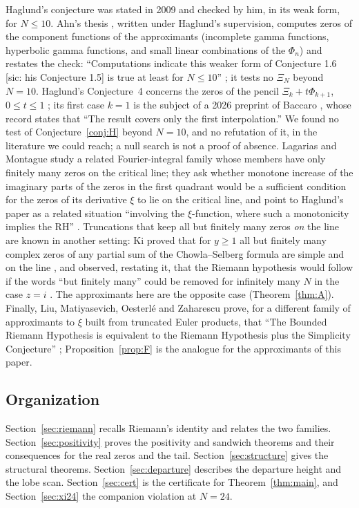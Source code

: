 \documentclass[11pt]{article}
\theoremstyle{plain}
\theoremstyle{definition}
\theoremstyle{remark}
\begin{document}
Haglund's conjecture was stated in 2009 \cite{Hag, HagJ} and checked by him, in
its weak form, for $N \le 10$. Ahn's thesis \cite{Ahn}, written under Haglund's
supervision, computes zeros of the component functions of the approximants
(incomplete gamma functions, hyperbolic gamma functions, and small linear
combinations of the $\Phi_n$) and restates the check: ``Computations indicate
this weaker form of Conjecture 1.6 [sic: his Conjecture 1.5] is true at least for $N \le 10$''
\cite[pp.~10--11]{Ahn}; it tests no $\Xi_N$ beyond $N = 10$. Haglund's Conjecture~4
concerns the zeros of the pencil $\Xi_k + t\Phi_{k+1}$, $0 \le t \le 1$
\cite[p.~11]{Hag}; its first case $k = 1$ is the subject of a 2026 preprint of
Baccaro \cite{Bac}, whose record states that ``The result covers only the first
interpolation.'' We found no test of Conjecture~\ref{conj:H} beyond $N = 10$, and
no refutation of it, in the literature we could reach; a null search is not a
proof of absence. Lagarias and Montague study a related Fourier-integral family
whose members have only finitely many zeros on the critical line; they ask
whether monotone increase of the imaginary parts of the zeros in the first
quadrant would be a sufficient condition for the zeros of its derivative $\xi$ to
lie on the critical line, and point to Haglund's paper as a related situation ``involving the $\xi$-function,
where such a monotonicity implies the RH'' \cite[p.~24]{LM}. Truncations that keep
all but finitely many zeros \emph{on} the line are known in another setting: Ki
proved that for $y \ge 1$ all but finitely many complex zeros of any partial sum
of the Chowla--Selberg formula are simple and on the line \cite[Corollary~1]{KiP}, and
observed, restating it, that the Riemann hypothesis would follow if the words ``but finitely many'' could be
removed for infinitely many $N$ in the case $z = i$ \cite[p.~198]{Ki}. The
approximants here are the opposite case (Theorem~\ref{thm:A}). Finally,
Liu, Matiyasevich, Oesterl\'e and Zaharescu prove, for a different family of
approximants to $\xi$ built from truncated Euler products, that ``The Bounded
Riemann Hypothesis is equivalent to the Riemann Hypothesis plus the Simplicity
Conjecture'' \cite[Theorem~1.7]{LMOZ}; Proposition~\ref{prop:F} is the analogue
for the approximants of this paper.

\subsection{Organization}

Section~\ref{sec:riemann} recalls Riemann's identity and relates the two
families. Section~\ref{sec:positivity} proves the positivity and sandwich
theorems and their consequences for the real zeros and the tail. Section~\ref{sec:structure} gives the
structural theorems. Section~\ref{sec:departure} describes the departure height
and the lobe scan. Section~\ref{sec:cert} is the certificate for
Theorem~\ref{thm:main}, and Section~\ref{sec:xi24} the companion violation at
$N = 24$.
\end{document}

